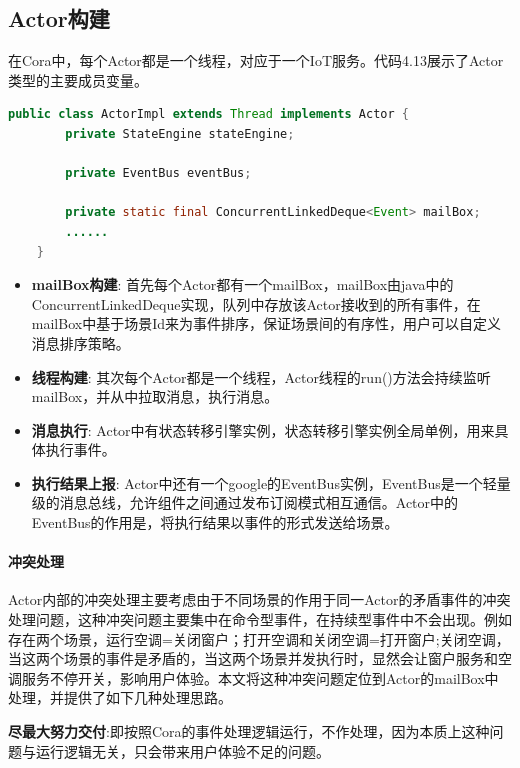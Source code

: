 \documentclass[winfonts,master,twoside]{njuthesis}
\begin{document}
\subsection{Actor构建}
在Cora中，每个Actor都是一个线程，对应于一个IoT服务。代码4.13展示了Actor类型的主要成员变量。
   \begin{lstlisting}[caption={Actor类型结构},label={lst:Actor},language=java,basicstyle=\footnotesize]
    public class ActorImpl extends Thread implements Actor {
        private StateEngine stateEngine;
        
        private EventBus eventBus;
        
        private static final ConcurrentLinkedDeque<Event> mailBox;
        ......
    }
    \end{lstlisting}
    
\begin{itemize}
    \item \textbf{mailBox构建}:
    首先每个Actor都有一个mailBox，mailBox由java中的ConcurrentLinkedDeque实现，队列中存放该Actor接收到的所有事件，在mailBox中基于场景Id来为事件排序，保证场景间的有序性，用户可以自定义消息排序策略。
    \item \textbf{线程构建}:
    其次每个Actor都是一个线程，Actor线程的run()方法会持续监听mailBox，并从中拉取消息，执行消息。
    \item \textbf{消息执行}:
    Actor中有状态转移引擎实例，状态转移引擎实例全局单例，用来具体执行事件。
    \item \textbf{执行结果上报}:
    Actor中还有一个google的EventBus实例，EventBus是一个轻量级的消息总线，允许组件之间通过发布订阅模式相互通信。Actor中的EventBus的作用是，将执行结果以事件的形式发送给场景。
\end{itemize}

\paragraph{冲突处理}
Actor内部的冲突处理主要考虑由于不同场景的作用于同一Actor的矛盾事件的冲突处理问题，这种冲突问题主要集中在命令型事件，在持续型事件中不会出现。例如存在两个场景，运行空调={关闭窗户；打开空调}和关闭空调={打开窗户;关闭空调}，当这两个场景的事件是矛盾的，当这两个场景并发执行时，显然会让窗户服务和空调服务不停开关，影响用户体验。本文将这种冲突问题定位到Actor的mailBox中处理，并提供了如下几种处理思路。

\textbf{尽最大努力交付}:即按照Cora的事件处理逻辑运行，不作处理，因为本质上这种问题与运行逻辑无关，只会带来用户体验不足的问题。
\end{document}
